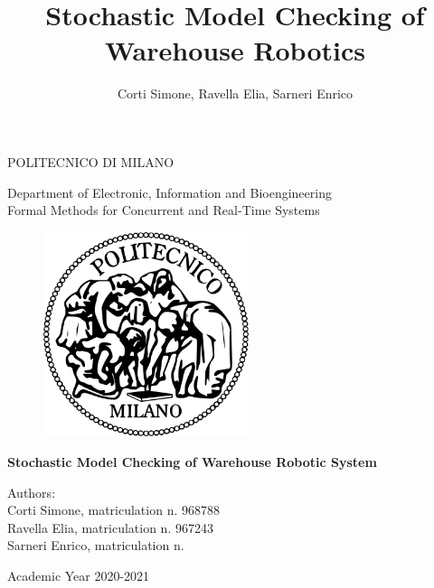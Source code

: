 \documentclass[10pt,a4paper]{article}
\title{Stochastic Model Checking of Warehouse Robotics}
\author{Corti Simone, Ravella Elia, Sarneri Enrico}
\begin{document}
	\begin{titlepage}

		\thispagestyle{empty}
		\vspace*{-1.5cm} \bfseries{
			\begin{center}
				\LARGE
				POLITECNICO DI MILANO\\
				\vspace*{.3truecm}
				
				\large				
				Department of Electronic, Information and Bioengineering\\
				\vspace*{.1truecm}
				Formal Methods for Concurrent and Real-Time Systems\\
				\vspace*{.75truecm}
				
				\begin{figure}[htbp]
					\begin{center}
						\includegraphics[width=6cm]{./Images/logo_poli.png}
					\end{center}
				\end{figure}
				
				\vspace*{0.8cm} 
				\LARGE
				\textbf{Stochastic Model Checking of Warehouse Robotic System}\\
				\vspace*{4.5truecm}
			\end{center}
		}
		
		\mdseries
		
		\begin{center}
			\large
			Authors:\\ Corti Simone, matriculation n. 968788 \\ 
			Ravella Elia, matriculation n. 967243 \\
			Sarneri Enrico, matriculation n. \\

			\vspace*{1cm}

			Academic Year 2020-2021
		\end{center} 

    \end{titlepage}
	\clearpage
	
\end{document}
